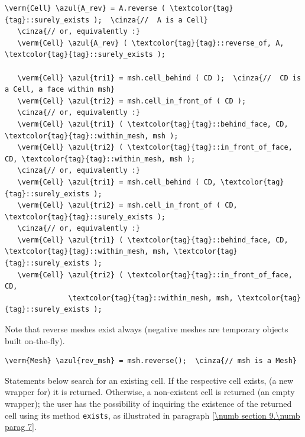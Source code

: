 \begin{Verbatim}[commandchars=\\\{\},formatcom=\small\tt,
   baselinestretch=0.94,framesep=2mm                      ]
   \verm{Cell} \azul{A_rev} = A.reverse ( \textcolor{tag}{tag}::surely_exists );  \cinza{//  A is a Cell}
   \cinza{// or, equivalently :}
   \verm{Cell} \azul{A_rev} ( \textcolor{tag}{tag}::reverse_of, A, \textcolor{tag}{tag}::surely_exists );

   \verm{Cell} \azul{tri1} = msh.cell_behind ( CD );  \cinza{//  CD is a Cell, a face within msh}
   \verm{Cell} \azul{tri2} = msh.cell_in_front_of ( CD );
   \cinza{// or, equivalently :}
   \verm{Cell} \azul{tri1} ( \textcolor{tag}{tag}::behind_face, CD, \textcolor{tag}{tag}::within_mesh, msh );
   \verm{Cell} \azul{tri2} ( \textcolor{tag}{tag}::in_front_of_face, CD, \textcolor{tag}{tag}::within_mesh, msh );
   \cinza{// or, equivalently :}
   \verm{Cell} \azul{tri1} = msh.cell_behind ( CD, \textcolor{tag}{tag}::surely_exists );
   \verm{Cell} \azul{tri2} = msh.cell_in_front_of ( CD, \textcolor{tag}{tag}::surely_exists );
   \cinza{// or, equivalently :}
   \verm{Cell} \azul{tri1} ( \textcolor{tag}{tag}::behind_face, CD, \textcolor{tag}{tag}::within_mesh, msh, \textcolor{tag}{tag}::surely_exists );
   \verm{Cell} \azul{tri2} ( \textcolor{tag}{tag}::in_front_of_face, CD,
               \textcolor{tag}{tag}::within_mesh, msh, \textcolor{tag}{tag}::surely_exists );
\end{Verbatim}

Note that reverse meshes exist always (negative meshes are temporary objects built
on-the-fly).

\begin{Verbatim}[commandchars=\\\{\},formatcom=\small\tt,
   baselinestretch=0.94,framesep=2mm                      ]
   \verm{Mesh} \azul{rev_msh} = msh.reverse();  \cinza{// msh is a Mesh}
\end{Verbatim}

Statements below search for an existing cell.
If the respective cell exists, (a new wrapper for) it is returned.
Otherwise, a non-existent cell is returned
(an empty wrapper); the user has the possibility of inquiring the existence
of the returned cell using its method {\small\tt exists}, as illustrated in paragraph
\ref{\numb section 9.\numb parag 7}.

